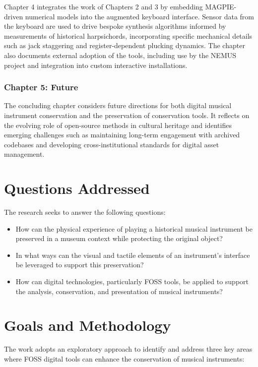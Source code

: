Chapter 4 integrates the work of Chapters 2 and 3 by embedding MAGPIE-driven numerical models into the augmented keyboard interface. Sensor data from the keyboard are used to drive bespoke synthesis algorithms informed by measurements of historical harpsichords, incorporating specific mechanical details such as jack staggering and register-dependent plucking dynamics. The chapter also documents external adoption of the tools, including use by the NEMUS project and integration into custom interactive installations.

\subsubsection{Chapter 5: Future}

The concluding chapter considers future directions for both digital musical instrument conservation and the preservation of conservation tools. It reflects on the evolving role of open-source methods in cultural heritage and identifies emerging challenges such as maintaining long-term engagement with archived codebases and developing cross-institutional standards for digital asset management.

\section{Questions Addressed}

The research seeks to answer the following questions:

\begin{itemize}
    \item How can the physical experience of playing a historical musical instrument be preserved in a museum context while protecting the original object?
    \item In what ways can the visual and tactile elements of an instrument’s interface be leveraged to support this preservation?
    \item How can digital technologies, particularly FOSS tools, be applied to support the analysis, conservation, and presentation of musical instruments?
\end{itemize}

\section{Goals and Methodology}

The work adopts an exploratory approach to identify and address three key areas where FOSS digital tools can enhance the conservation of musical instruments:

